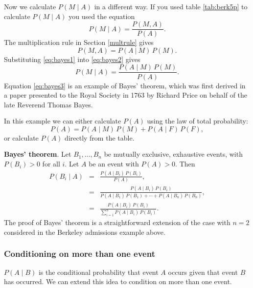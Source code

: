 \documentclass[
  11pt,
  british,
  openany, a4paper]{book}
\begin{document}
Now we calculate \(P(M \mid A)\) in a different way. If you used table \ref{tab:berk5p} to calculate \(P(M \mid A)\) you used the equation
\begin{equation}
P(M \mid A) = \frac{P(M , A)}{P(A)}. 
\label{eq:bayes1}
\end{equation}
The multiplication rule in Section \ref{multrule} gives
\begin{equation}
P(M , A) = P(A~|~M)\,P(M). 
\label{eq:bayes2}
\end{equation}
Substituting \eqref{eq:bayes1} into \eqref{eq:bayes2} gives
\begin{equation}
P(M \mid A) = \frac{P(A \mid M)\,P(M)}{P(A)}. 
\label{eq:bayes3}
\end{equation}
Equation \eqref{eq:bayes3} is an example of Bayes' theorem, which was first derived in a paper presented to the Royal Society in 1763 by Richard Price on behalf of the late Reverend Thomas Bayes.

In this example we can either calculate \(P(A)\) using the law of total probability:
\[ P(A) = P(A \mid M)\,P(M) + P(A \mid F)\,P(F), \]
or calculate \(P(A)\) directly from the table.

\textbf{Bayes' theorem}. Let \(B_1, \ldots, B_n\) be mutually exclusive, exhaustive events, with \(P(B_i) > 0\) for all \(i\). Let \(A\) be an event with \(P(A) > 0\). Then
\begin{eqnarray}
P(B_i \mid A) &=& \frac{P(A \mid B_i)\,P(B_i)}{P(A)}, \\ 
&=& \frac{P(A \mid B_i)\,P(B_i)}{P(A \mid B_1)\,P(B_1) + \cdots + P(A \mid B_n)\,P(B_n)}, \\
          &=& \frac{P(A \mid B_i)\,P(B_i)}{\displaystyle\sum_{i=1}^n P(A \mid B_i)\,P(B_i)}.
\end{eqnarray}
The proof of Bayes' theorem is a straightforward extension of the case with \(n=2\) considered in the Berkeley admissions example above.

\hypertarget{conditioning-on-more-than-one-event}{%
\subsubsection*{Conditioning on more than one event}\label{conditioning-on-more-than-one-event}}

\(P(A \mid B)\) is the conditional probability that event \(A\) occurs given that event \(B\) has occurred. We can extend this idea to condition on more than one event.
\end{document}
